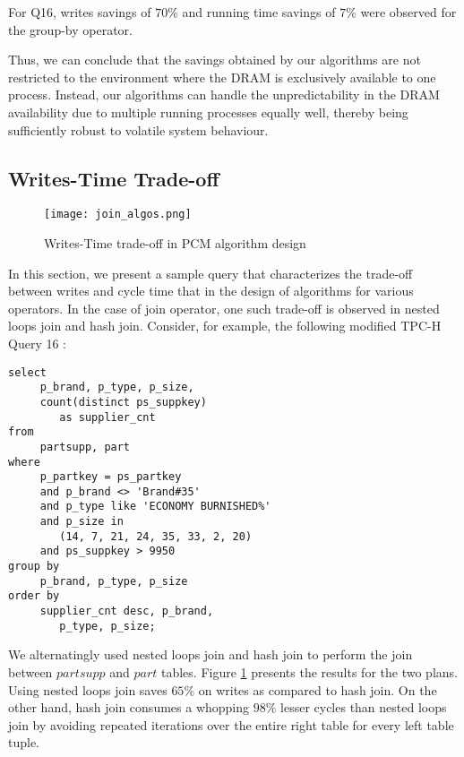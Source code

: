For Q16, writes savings of $70\%$ and running time savings of $7\%$
were observed for the group-by operator.

Thus, we can conclude that the savings obtained by our algorithms are
not restricted to the environment where the DRAM is exclusively available
to one process. Instead, our algorithms can handle the unpredictability
in the DRAM availability due to multiple running processes equally well,
thereby being sufficiently robust to volatile system behaviour.


\subsection{Writes-Time Trade-off}
\label{tradeoff}
\begin{figure}[htbp]
	\centering
 	\texttt{[image: join\_algos.png]}
	\caption{Writes-Time trade-off in PCM algorithm design}
	\label{fig:join_algos}
\end{figure}
In this section, we present a sample query that characterizes the trade-off between writes and cycle time that in the design of algorithms for various operators. In the case of join operator, one such trade-off is observed in nested loops join and hash join. Consider, for example, the following modified TPC-H Query 16 :
\begin{verbatim}
select 
     p_brand, p_type, p_size,
     count(distinct ps_suppkey) 
     	as supplier_cnt
from 
     partsupp, part
where 
     p_partkey = ps_partkey
     and p_brand <> 'Brand#35'
     and p_type like 'ECONOMY BURNISHED%'
     and p_size in 
     	(14, 7, 21, 24, 35, 33, 2, 20)
     and ps_suppkey > 9950
group by 
     p_brand, p_type, p_size
order by 
     supplier_cnt desc, p_brand, 
     	p_type, p_size;
\end{verbatim}
We alternatingly used nested loops join and hash join to perform the join between $partsupp$ and $part$ tables. Figure \ref{fig:join_algos} presents the results for the two plans. Using nested loops join saves $65\%$ on writes as compared to hash join. On the other hand, hash join consumes a whopping $98\%$ lesser cycles than nested loops join by avoiding repeated iterations over the entire right table for every left table tuple. 

